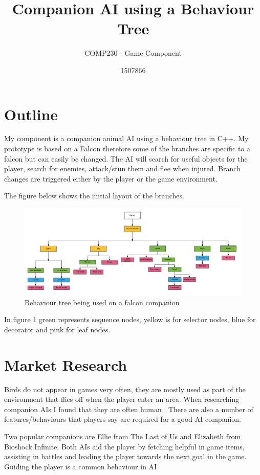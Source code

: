 \documentclass{scrartcl}
\title{ Companion AI using a Behaviour Tree }
\subtitle{COMP230 - Game Component}
\author{1507866}
\begin{document}
	
\maketitle
	
\section{Outline}
My component is a companion animal AI using a behaviour tree in C++. My prototype is based on a Falcon therefore some of the branches are specific to a falcon but can easily be changed. The AI will search for useful objects for the player, search for enemies, attack/stun them and flee when injured.
 Branch changes are triggered either by the player or the game environment. 

The figure below shows the initial layout of the branches.
\begin{figure}[h]
	\includegraphics[width=1.2\linewidth]{behaviour_tree.png}
	\caption{ Behaviour tree being used on a falcon companion}
\end{figure} 

In figure 1 green represents sequence nodes, yellow is for selector nodes, blue for decorator and pink for leaf nodes.
 

\section{Market Research}
Birds do not appear in games very often, they are mostly used as part of the environment that flies off when the player enter an area.
When researching companion AIs I found that they are often human \cite{DragonAge, LastOfUs, Bioshock}. There are also a number of features/behaviours that players say are required for a good AI companion. 

Two popular companions are Ellie from The Last of Us and Elizabeth from Bioshock Infinite. Both AIs aid the player by fetching helpful in game items, assisting in battles and leading the player towards the next goal in the game.
Guiding the player is a common behaviour in AI 
\end{document}
